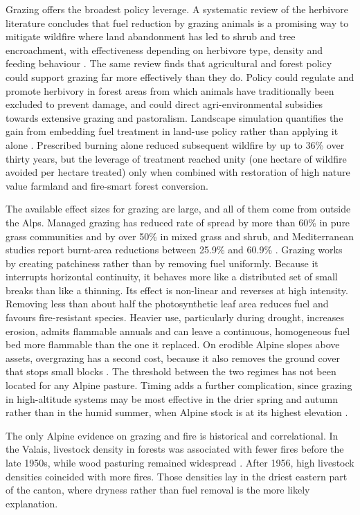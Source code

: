 \documentclass[11pt,a4paper]{article}
\begin{document}
Grazing offers the broadest policy leverage. A systematic review of the herbivore literature concludes that fuel reduction by grazing animals is a promising way to mitigate wildfire where land abandonment has led to shrub and tree encroachment, with effectiveness depending on herbivore type, density and feeding behaviour \citep{rouetleduc_effects_2021}. The same review finds that agricultural and forest policy could support grazing far more effectively than they do. Policy could regulate and promote herbivory in forest areas from which animals have traditionally been excluded to prevent damage, and could direct agri-environmental subsidies towards extensive grazing and pastoralism. Landscape simulation quantifies the gain from embedding fuel treatment in land-use policy rather than applying it alone \citep{pais_optimizing_2023}. Prescribed burning alone reduced subsequent wildfire by up to 36\% over thirty years, but the leverage of treatment reached unity (one hectare of wildfire avoided per hectare treated) only when combined with restoration of high nature value farmland and fire-smart forest conversion.

The available effect sizes for grazing are large, and all of them come from outside the Alps. Managed grazing has reduced rate of spread by more than 60\% in pure grass communities and by over 50\% in mixed grass and shrub, and Mediterranean studies report burnt-area reductions between 25.9\% and 60.9\% \citep{xu_how_2026}. Grazing works by creating patchiness rather than by removing fuel uniformly. Because it interrupts horizontal continuity, it behaves more like a distributed set of small breaks than like a thinning. Its effect is non-linear and reverses at high intensity. Removing less than about half the photosynthetic leaf area reduces fuel and favours fire-resistant species. Heavier use, particularly during drought, increases erosion, admits flammable annuals and can leave a continuous, homogeneous fuel bed more flammable than the one it replaced. On erodible Alpine slopes above assets, overgrazing has a second cost, because it also removes the ground cover that stops small blocks \citep{asteriou_assessing_2025}. The threshold between the two regimes has not been located for any Alpine pasture. Timing adds a further complication, since grazing in high-altitude systems may be most effective in the drier spring and autumn rather than in the humid summer, when Alpine stock is at its highest elevation \citep{xu_how_2026}.

The only Alpine evidence on grazing and fire is historical and correlational. In the Valais, livestock density in forests was associated with fewer fires before the late 1950s, while wood pasturing remained widespread \citep{zumbrunnen_human_2012}. After 1956, high livestock densities coincided with more fires. Those densities lay in the driest eastern part of the canton, where dryness rather than fuel removal is the more likely explanation.
\end{document}
